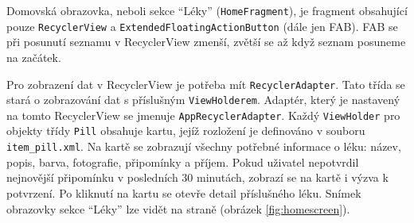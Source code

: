 \documentclass[../TakeYourPill.tex]{subfiles}
\begin{document}
Domovská obrazovka, neboli sekce \enquote{Léky} (\texttt{HomeFragment}), je fragment obsahující pouze \texttt{RecyclerView} a \texttt{ExtendedFloatingActionButton} (dále jen FAB). FAB se při posunutí seznamu v RecyclerView zmenší, zvětší se až když seznam posuneme na začátek. 

Pro zobrazení dat v RecyclerView je potřeba mít \texttt{RecyclerAdapter}. Tato třída se stará o zobrazování dat s příslušným \texttt{ViewHolderem}. Adaptér, který je nastavený na tomto RecyclerView se jmenuje \texttt{AppRecyclerAdapter}. Každý \texttt{ViewHolder} pro objekty třídy \texttt{Pill} obsahuje kartu, jejíž rozložení je definováno v souboru \texttt{item\_pill.xml}. Na kartě se zobrazují všechny potřebné informace o léku: název, popis, barva, fotografie, připomínky a příjem. Pokud uživatel nepotvrdil nejnovější připomínku v posledních 30 minutách, zobrazí se na kartě i výzva k potvrzení. Po kliknutí na kartu se otevře detail příslušného léku. Snímek obrazovky sekce \enquote{Léky} lze vidět na straně \pageref{fig:homescreen} (obrázek \ref{fig:homescreen}).



\end{document}
